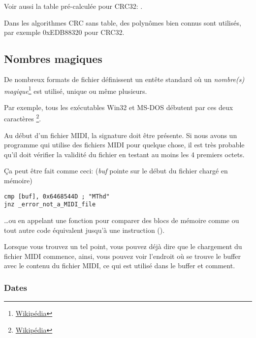 Voir aussi la table pré-calculée pour CRC32: .

Dans les algorithmes CRC sans table, des polynômes bien connus sont utilisés, par
exemple 0xEDB88320 pour CRC32.

\subsection{Nombres magiques}
\label{magic_numbers}

\newcommand{\FNURLMAGIC}{\footnote{\href{http://go.yurichev.com/17112}{Wikipédia}}}

De nombreux formats de fichier définissent un entête standard où un \emph{nombre(s) magique}\FNURLMAGIC{}
est utilisé, unique ou même plusieurs.


Par exemple, tous les exécutables Win32 et MS-DOS débutent par ces deux caractères \footnote{\href{http://go.yurichev.com/17113}{Wikipédia}}.


Au début d'un fichier MIDI, la signature  doit être présente.
Si nous avons un programme qui utilise des fichiers MIDI pour quelque chose, il
est très probable qu'il doit vérifier la validité du fichier en testant au moins
les 4 premiers octets.

Ça peut être fait comme ceci:
(\emph{buf} pointe sur le début du fichier chargé en mémoire)

\begin{lstlisting}[style=customasmx86]
cmp [buf], 0x6468544D ; "MThd"
jnz _error_not_a_MIDI_file
\end{lstlisting}


\dots ou en appelant une fonction pour comparer des blocs de mémoire comme 
ou tout autre code équivalent jusqu'à une instruction  ().

Lorsque vous trouvez un tel point, vous pouvez déjà dire que le chargement du fichier
MIDI commence, ainsi, vous pouvez voir l'endroit où se trouve le buffer avec le contenu
du fichier MIDI, ce qui est utilisé dans le buffer et comment.

\subsubsection{Dates}

